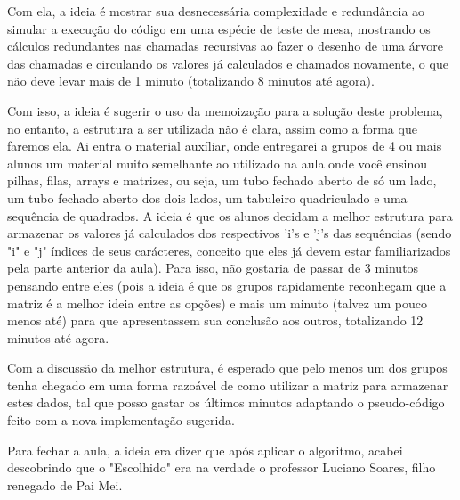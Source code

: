 \documentclass[11pt]{article}
\begin{document}
Com ela, a ideia é mostrar sua desnecessária complexidade e redundância ao simular a
execução do código em uma espécie de teste de mesa, mostrando os cálculos redundantes
nas chamadas recursivas ao fazer o desenho de uma árvore das chamadas e circulando os
valores já calculados e chamados novamente, o que não deve levar mais de 1 minuto
(totalizando 8 minutos até agora).

Com isso, a ideia é sugerir o uso da memoização para a solução deste problema, no
entanto, a estrutura a ser utilizada não é clara, assim como a forma que faremos ela.
Ai entra o material auxíliar, onde entregarei a grupos de 4 ou mais alunos um material
muito semelhante ao utilizado na aula onde você ensinou pilhas, filas, arrays e matrizes,
ou seja, um tubo fechado aberto de só um lado, um tubo fechado aberto dos dois lados, um
tabuleiro quadriculado e uma sequência de quadrados. A ideia é que os alunos decidam a
melhor estrutura para armazenar os valores já calculados dos respectivos 'i's e 'j's das
sequências (sendo "i" e "j" índices de seus carácteres, conceito que eles já devem estar
familiarizados pela parte anterior da aula). Para isso, não gostaria de passar de 3
minutos pensando entre eles (pois a ideia é que os grupos rapidamente reconheçam que
a matriz é a melhor ideia entre as opções) e mais um minuto (talvez um pouco menos até)
para que apresentassem sua conclusão aos outros, totalizando 12 minutos até agora.

Com a discussão da melhor estrutura, é esperado que pelo menos um dos grupos tenha
chegado em uma forma razoável de como utilizar a matriz para armazenar estes dados,
tal que posso gastar os últimos minutos adaptando o pseudo-código feito com a
nova implementação sugerida.

Para fechar a aula, a ideia era dizer que após aplicar o algoritmo, acabei descobrindo
que o "Escolhido" era na verdade o professor Luciano Soares, filho renegado de Pai Mei.
\end{document}
